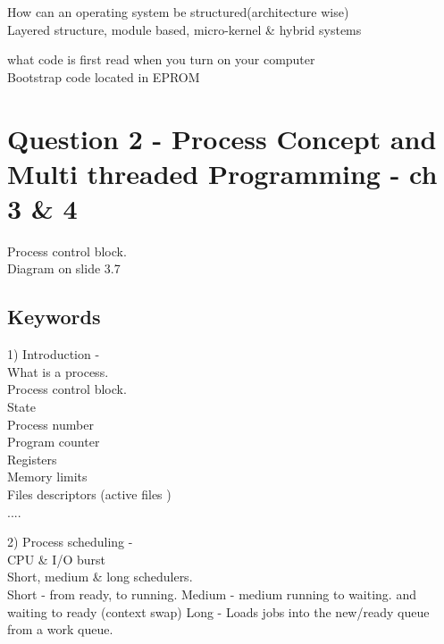 \documentclass[a4paper,10pt,titlepage]{report}
\begin{document}
How can an operating system be structured(architecture wise)\\
\hspace{10mm} Layered structure, module based, micro-kernel \& hybrid systems\\ \vspace{5mm} 


what code is first read when you turn on your computer\\
\hspace{10mm}Bootstrap code located in EPROM \\ \vspace{5mm}





\newpage
\section{Question 2 - Process Concept and Multi threaded Programming - ch 3 \& 4}
Process control block. \\ Diagram on slide 3.7
\vspace{5mm}

\subsection{Keywords}
1) Introduction - \\
\hspace{10mm}	What is a process. \\
\hspace{10mm}	Process control block. \\
\hspace{15mm}	State \\
\hspace{15mm}	Process number \\
\hspace{15mm}	Program counter \\
\hspace{15mm} 	Registers \\
\hspace{15mm}	Memory limits \\
\hspace{15mm} 	Files descriptors (active files ) \\
\hspace{15mm} 	.... \\
\vspace{5mm}


2) Process scheduling - \\
\hspace{10mm}	CPU \& I/O burst \\
\hspace{10mm}	Short, medium \& long schedulers.\\
\hspace{15mm}   Short - from ready, to running.
\hspace{15mm}	Medium - medium running to waiting. and waiting to ready (context swap)
\hspace{15mm}	Long - Loads jobs into the new/ready queue from a work queue.
\end{document}
